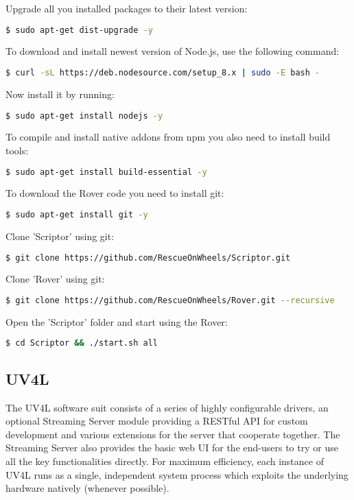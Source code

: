 Upgrade all you installed packages to their latest version:
\begin{lstlisting}[language=bash]
  $ sudo apt-get dist-upgrade -y
\end{lstlisting}

To download and install newest version of Node.js, use the following command:
\begin{lstlisting}[language=bash]
  $ curl -sL https://deb.nodesource.com/setup_8.x | sudo -E bash -
\end{lstlisting}

Now install it by running: 
\begin{lstlisting}[language=bash]
  $ sudo apt-get install nodejs -y
\end{lstlisting}

To compile and install native addons from npm you also need to install build tools: 
\begin{lstlisting}[language=bash]
  $ sudo apt-get install build-essential -y
\end{lstlisting}

To download the Rover code you need to install git: 
\begin{lstlisting}[language=bash]
  $ sudo apt-get install git -y
\end{lstlisting}

Clone 'Scriptor' using git: 
\begin{lstlisting}[language=bash]
  $ git clone https://github.com/RescueOnWheels/Scriptor.git
\end{lstlisting}

Clone 'Rover' using git: 
\begin{lstlisting}[language=bash]
  $ git clone https://github.com/RescueOnWheels/Rover.git --recursive
\end{lstlisting}

Open the 'Scriptor' folder and start using the Rover: 
\begin{lstlisting}[language=bash]
  $ cd Scriptor && ./start.sh all
\end{lstlisting}

\newpage
\subsection{UV4L}
The UV4L software suit consists of a series of highly configurable drivers, an optional Streaming Server module providing a RESTful API for custom development and various extensions for the server that cooperate together. The Streaming Server also provides the basic web UI for the end-users to try or use all the key functionalities directly. For maximum efficiency, each instance of UV4L runs as a single, independent system process which exploits the underlying hardware natively (whenever possible).

